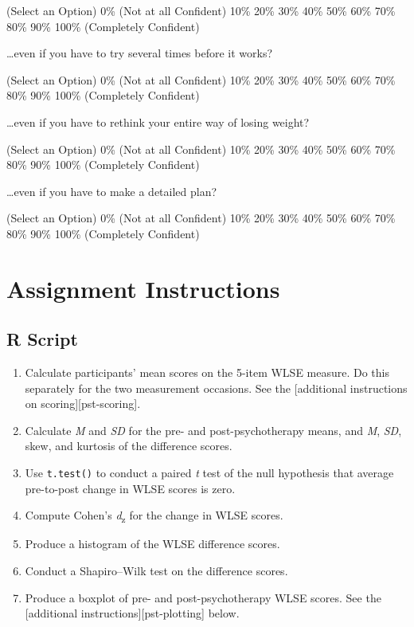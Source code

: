 \documentclass[
]{book}
\providecommand{\tightlist}{%
  \setlength{\itemsep}{0pt}\setlength{\parskip}{0pt}}
\begin{document}
(Select an Option)
0\% (Not at all Confident)
10\%
20\%
30\%
40\%
50\%
60\%
70\%
80\%
90\%
100\% (Completely Confident)

\ldots even if you have to try several times before it works?

(Select an Option)
0\% (Not at all Confident)
10\%
20\%
30\%
40\%
50\%
60\%
70\%
80\%
90\%
100\% (Completely Confident)

\ldots even if you have to rethink your entire way of losing weight?

(Select an Option)
0\% (Not at all Confident)
10\%
20\%
30\%
40\%
50\%
60\%
70\%
80\%
90\%
100\% (Completely Confident)

\ldots even if you have to make a detailed plan?

(Select an Option)
0\% (Not at all Confident)
10\%
20\%
30\%
40\%
50\%
60\%
70\%
80\%
90\%
100\% (Completely Confident)

\hypertarget{pst-assignment}{%
\section{Assignment Instructions}\label{pst-assignment}}

\hypertarget{r-script-1}{%
\subsection{R Script}\label{r-script-1}}

\begin{enumerate}
\def\labelenumi{\arabic{enumi}.}
\tightlist
\item
  Calculate participants' mean scores on the 5-item WLSE measure. Do this separately for the two measurement occasions. See the {[}additional instructions on scoring{]}{[}pst-scoring{]}.
\item
  Calculate \emph{M} and \emph{SD} for the pre- and post-psychotherapy means, and \emph{M}, \emph{SD}, skew, and kurtosis of the difference scores.
\item
  Use \texttt{t.test()} to conduct a paired \emph{t} test of the null hypothesis that average pre-to-post change in WLSE scores is zero.
\item
  Compute Cohen's \emph{d}\textsubscript{z} for the change in WLSE scores.
\item
  Produce a histogram of the WLSE difference scores.
\item
  Conduct a Shapiro--Wilk test on the difference scores.
\item
  Produce a boxplot of pre- and post-psychotherapy WLSE scores. See the {[}additional instructions{]}{[}pst-plotting{]} below.
\end{enumerate}
\end{document}
